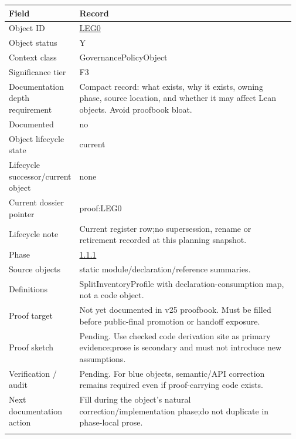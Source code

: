\begin{longtable}{L{0.16\linewidth} L{0.81\linewidth}}
\hline
\textbf{Field} & \textbf{Record}\\
\hline
Object ID & \hyperlink{object-row-LEG0}{LEG0}\\
\hline\addlinespace[0.20em]
Object status & Y\\
\hline\addlinespace[0.20em]
Context class & GovernancePolicyObject\\
\hline\addlinespace[0.20em]
Significance tier & F3\\
\hline\addlinespace[0.20em]
Documentation depth requirement & Compact record: what exists, why it exists, owning phase, source location, and whether it may affect Lean objects. Avoid proofbook bloat.\\
\hline\addlinespace[0.20em]
Documented & no\\
\hline\addlinespace[0.20em]
Object lifecycle state & current\\
\hline\addlinespace[0.20em]
Lifecycle successor/\allowbreak{}current object & none\\
\hline\addlinespace[0.20em]
Current dossier pointer & proof:LEG0\\
\hline\addlinespace[0.20em]
Lifecycle note & Current register row;\newline no supersession, rename or retirement recorded at this planning snapshot.\\
\hline\addlinespace[0.20em]
Phase & \hyperlink{phase-row-1-1-1}{1.1.1}\\
\hline\addlinespace[0.20em]
Source objects & static module/\allowbreak{}declaration/\allowbreak{}reference summaries.\\
\hline\addlinespace[0.20em]
Definitions & SplitInventoryProfile with declaration-consumption map, not a code object.\\
\hline\addlinespace[0.20em]
Proof target & Not yet documented in v25 proofbook. Must be filled before public-final promotion or handoff exposure.\\
\hline\addlinespace[0.20em]
Proof sketch & Pending. Use checked code derivation site as primary evidence;\newline prose is secondary and must not introduce new assumptions.\\
\hline\addlinespace[0.20em]
Verification /\allowbreak{} audit & Pending. For blue objects, semantic/\allowbreak{}API correction remains required even if proof-carrying code exists.\\
\hline\addlinespace[0.20em]
Next documentation action & Fill during the object's natural correction/\allowbreak{}implementation phase;\newline do not duplicate in phase-local prose.\\
\hline\addlinespace[0.20em]
\end{longtable}
